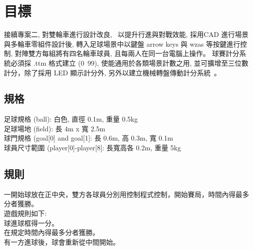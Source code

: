 \chapter{目標}
接續專案二, 對雙輪車進行設計改良,  以提升行進與對戰效能, 採用CAD 進行場景與多輪車零組件設計後, 轉入足球場景中以鍵盤 arrow keys 與 wzas 等按鍵進行控制, 對陣雙方每組將有四名輪車球員, 且每兩人在同一台電腦上操作。
球賽計分系統必須採 .ttm 格式建立 (0~99), 使能通用於各類場景計數之用, 並可擴增至三位數計分，除了採用 LED 顯示計分外, 另外以建立機械轉盤傳動計分系統 。

\section{規格}

足球規格 (ball): 白色, 直徑 0.1m, 重量 0.5kg \\
足球場地 (field): 長 4m x 寬 2.5m \\
球門規格 (goal[0] and goal[1]: 長 0.6m, 高 0.3m, 寬 0.1m \\
球員尺寸範圍 (player[0]-player[8]: 長寬高各 0.2m, 重量 5kg \\

\section{規則}

一開始球放在正中央，雙方各球員分別用控制程式控制，開始賽局，時間內得最多分者獲勝。 \\
遊戲規則如下: \\
球進球框得一分。 \\
在規定時間內得最多分者獲勝。 \\
有一方進球後，球會重新從中間開始。 \\
